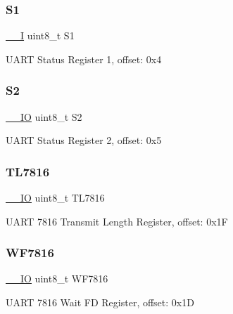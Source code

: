 \subsubsection{\texorpdfstring{S1}{S1}}
{\footnotesize\ttfamily \mbox{\hyperlink{core__cm0plus_8h_af63697ed9952cc71e1225efe205f6cd3}{\+\_\+\+\_\+I}} uint8\+\_\+t S1}

U\+A\+RT Status Register 1, offset\+: 0x4 \mbox{\label{struct_u_a_r_t___type_aafdaf251d5cfeb18803536542a880459}} 
\subsubsection{\texorpdfstring{S2}{S2}}
{\footnotesize\ttfamily \mbox{\hyperlink{core__cm0plus_8h_aec43007d9998a0a0e01faede4133d6be}{\+\_\+\+\_\+\+IO}} uint8\+\_\+t S2}

U\+A\+RT Status Register 2, offset\+: 0x5 \mbox{\label{struct_u_a_r_t___type_a7215388cabf525598a5fc937eb20ed31}} 
\subsubsection{\texorpdfstring{TL7816}{TL7816}}
{\footnotesize\ttfamily \mbox{\hyperlink{core__cm0plus_8h_aec43007d9998a0a0e01faede4133d6be}{\+\_\+\+\_\+\+IO}} uint8\+\_\+t T\+L7816}

U\+A\+RT 7816 Transmit Length Register, offset\+: 0x1F \mbox{\label{struct_u_a_r_t___type_a83913e1e59cc5b6a9f2906fab663be39}} 
\subsubsection{\texorpdfstring{WF7816}{WF7816}}
{\footnotesize\ttfamily \mbox{\hyperlink{core__cm0plus_8h_aec43007d9998a0a0e01faede4133d6be}{\+\_\+\+\_\+\+IO}} uint8\+\_\+t W\+F7816}

U\+A\+RT 7816 Wait FD Register, offset\+: 0x1D \mbox{\label{struct_u_a_r_t___type_a603f8619b1df91f8997fe58a2e54cf25}} 
